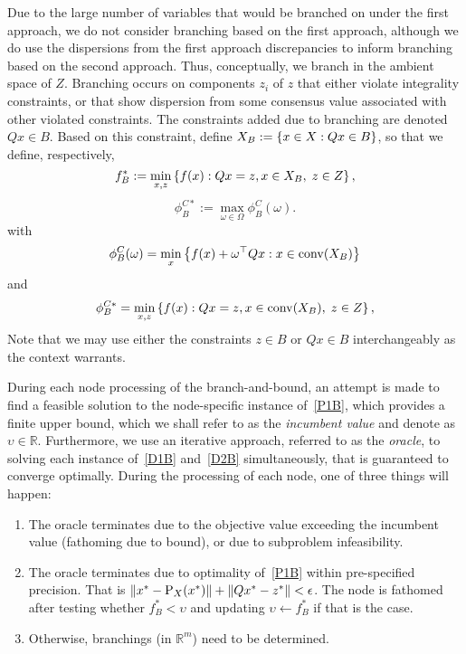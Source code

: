 Due to the large number of variables that would be branched on under the first approach, we do not consider branching based on the first approach, although we do use the dispersions from the first approach discrepancies to inform branching based on the second approach. Thus, conceptually, we branch in the ambient space of $Z$.
Branching occurs on components $z_i$ of $z$ that either violate integrality constraints, or that show dispersion from some consensus value associated with other violated constraints.
The constraints added due to branching are denoted $Qx \in B$. Based on this constraint, define $X_B:=\left\{ x \in X : Qx \in B \right \}$, so that we define, respectively,
\begin{equation}\label{P1B}
f_B^*:=\min_{x,z} \left\{ f(x) : Qx=z, x \in X_B,\; z \in Z \right \},
\end{equation}
\begin{equation}\label{D1B}
\phi_{B}^{C*}:=\max_{\omega \in \Omega} \phi_B^C(\omega).
\end{equation}
with
\begin{equation}\label{PhiCB}
\phi_B^C(\omega) = \min_x \left\{ f(x) + \omega^\top Qx : x \in \operatorname{conv}(X_B) \right \}
\end{equation} 
and
\begin{equation}\label{D2B}
\phi_{B}^{C*}=\min_{x,z} \left\{ f(x) : Qx=z, x \in \operatorname{conv}(X_B),\; z \in Z \right \},
\end{equation}
Note that we may use either the constraints $z \in B$ or $Qx \in B$ interchangeably as the context warrants.




During each node processing of the branch-and-bound, an attempt is made to find a feasible solution to the node-specific instance of~\eqref{P1B}, which provides a finite upper bound, which we shall refer to as the \emph{incumbent value} and denote as $\upsilon \in \mathbb{R}$. Furthermore, we use an iterative approach, referred to as the \emph{oracle}, to solving each instance of~\eqref{D1B} and~\eqref{D2B} simultaneously, that is guaranteed to converge optimally. During the processing of each node, one of three things will happen:
\begin{enumerate}
\item The oracle terminates due to the objective value exceeding the incumbent value (fathoming due to bound), or due to subproblem infeasibility.
\item The oracle terminates due to optimality of~\eqref{P1B} within pre-specified precision. 
That is $\left \| x^* - \text{P}_X(x^*) \right \| + \left \| Qx^* - z^* \right \| < \epsilon$. The node is fathomed after testing whether $f_B^* < \upsilon$
and updating $\upsilon \gets f_B^*$ if that is the case.
\item Otherwise, branchings (in $\mathbb{R}^m$) need to be determined.
\end{enumerate}

